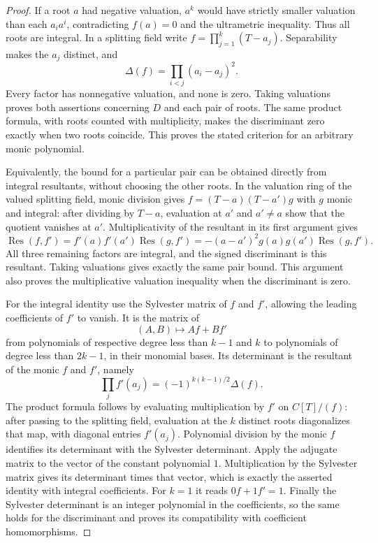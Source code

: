 \begin{proof}
If a root $a$ had negative valuation, $a^k$ would have strictly smaller
valuation than each $a_i a^i$, contradicting $f(a)=0$ and the
ultrametric inequality. Thus all roots are integral. In a splitting
field write $f=\prod_{j=1}^k(T-a_j)$. Separability makes the $a_j$
distinct, and
\[
 \Delta(f)=\prod_{i<j}(a_i-a_j)^2.
\]
Every factor has nonnegative valuation, and none is zero. Taking
valuations proves both assertions concerning $D$ and each pair of roots.
The same product formula, with roots counted with multiplicity, makes
the discriminant zero exactly when two roots coincide. This proves
the stated criterion for an arbitrary monic polynomial.

Equivalently, the bound for a particular pair can be obtained directly
from integral resultants, without choosing the other roots. In the
valuation ring of the valued splitting field, monic division gives
$f=(T-a)(T-a')g$ with $g$ monic and integral: after dividing by $T-a$,
evaluation at $a'$ and $a'\ne a$ show that the quotient vanishes at $a'$.
Multiplicativity of the resultant in its first argument gives
\[
 \operatorname{Res}(f,f')
 =f'(a)f'(a')\operatorname{Res}(g,f')
 =-(a-a')^2g(a)g(a')\operatorname{Res}(g,f').
\]
All three remaining factors are integral, and the signed
discriminant is this resultant. Taking valuations gives exactly the
same pair bound. This argument also proves the multiplicative
valuation inequality when the discriminant is zero.

For the integral identity use the Sylvester matrix of $f$ and $f'$,
allowing the leading coefficients of $f'$ to vanish. It is the matrix
of
\[
 (A,B)\longmapsto Af+Bf'
\]
from polynomials of respective degree less than $k-1$ and $k$ to
polynomials of degree less than $2k-1$, in their monomial bases.
Its determinant is the resultant of the monic $f$ and $f'$, namely
\[
 \prod_j f'(a_j)=(-1)^{k(k-1)/2}\Delta(f).
\]
The product formula follows by evaluating multiplication by $f'$ on
$C[T]/(f)$: after passing to the splitting field, evaluation at the
$k$ distinct roots diagonalizes that map, with diagonal entries
$f'(a_j)$. Polynomial division by the monic $f$ identifies its
determinant with the Sylvester determinant. Apply the adjugate matrix
to the vector of the constant polynomial $1$. Multiplication by the
Sylvester matrix gives its determinant times that vector, which is
exactly the asserted identity with integral coefficients. For $k=1$
it reads $0f+1f'=1$. Finally the Sylvester determinant is an integer
polynomial in the coefficients, so the same holds for the discriminant
and proves its compatibility with coefficient homomorphisms.
\end{proof}

